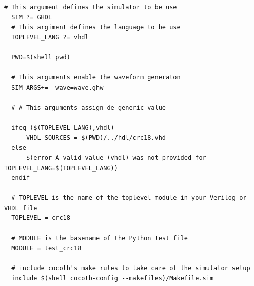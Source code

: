 \begin{lstlisting}[caption= "Makefile de ejemplo"]
  # This argument defines the simulator to be use
  SIM ?= GHDL
  # This argiment defines the language to be use
  TOPLEVEL_LANG ?= vhdl
  
  PWD=$(shell pwd)
  
  # This arguments enable the waveform generaton
  SIM_ARGS+=--wave=wave.ghw
  
  # # This arguments assign de generic value
  
  ifeq ($(TOPLEVEL_LANG),vhdl)
      VHDL_SOURCES = $(PWD)/../hdl/crc18.vhd
  else
      $(error A valid value (vhdl) was not provided for TOPLEVEL_LANG=$(TOPLEVEL_LANG))
  endif
  
  # TOPLEVEL is the name of the toplevel module in your Verilog or VHDL file
  TOPLEVEL = crc18
  
  # MODULE is the basename of the Python test file
  MODULE = test_crc18
  
  # include cocotb's make rules to take care of the simulator setup
  include $(shell cocotb-config --makefiles)/Makefile.sim
\end{lstlisting}
